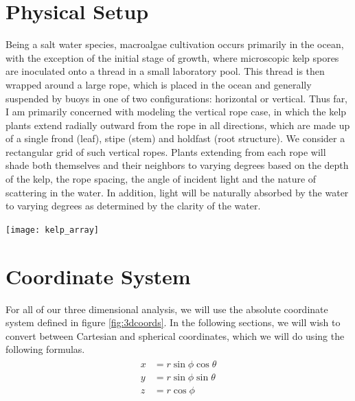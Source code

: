 \documentclass[10pt]{article}
\newenvironment{mcfig}
	{\par\medskip\noindent\minipage{\linewidth}}
	{\endminipage\par\medskip}
\begin{document}
\begin{multicols}{2}
\section{Physical Setup}
Being a salt water species, macroalgae cultivation occurs primarily in the ocean, with the exception of the initial stage of growth, where microscopic kelp spores are inoculated onto a thread in a small laboratory pool.
This thread is then wrapped around a large rope, which is placed in the ocean and generally suspended by buoys in one of two configurations: horizontal or vertical.
Thus far, I am primarily concerned with modeling the vertical rope case, in which the kelp plants extend radially outward from the rope in all directions, which are made up of a single frond (leaf), stipe (stem) and holdfast (root structure).
We consider a rectangular grid of such vertical ropes. 
Plants extending from each rope will shade both themselves and their neighbors to varying degrees based on the depth of the kelp, the rope spacing, the angle of incident light and the nature of scattering in the water.
In addition, light will be naturally absorbed by the water to varying degrees as determined by the clarity of the water.

\begin{mcfig}
	\centering
	\texttt{[image: kelp\_array]}
\end{mcfig}
\section{Coordinate System}
For all of our three dimensional analysis, we will use the absolute coordinate system defined in figure \ref{fig:3dcoords}.
In the following sections, we will wish to convert between Cartesian and spherical coordinates, which we will do using the following formulas.
\begin{align}
	\begin{split}
		x & = r\sin\phi\cos\theta \\
		y & = r\sin\phi\sin\theta \\
		z & = r\cos\phi \\
	\label{eqn:coords}
	\end{split}
\end{align}


\end{multicols}
\end{document}
